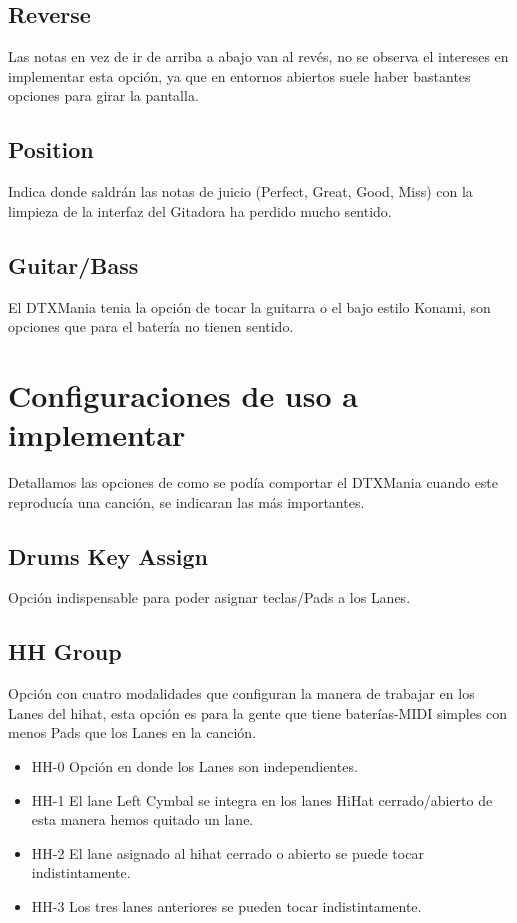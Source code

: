 \documentclass[a4paper,11pt,oneside]{book}
\begin{document}
\subsection{Reverse}
Las notas en vez de ir de arriba a abajo van al revés, no se observa el intereses en implementar esta opción, ya que en entornos abiertos suele haber bastantes opciones para girar la pantalla.

\subsection{Position}
Indica donde saldrán las notas de juicio (Perfect, Great, Good, Miss) con la limpieza de la interfaz del Gitadora ha perdido mucho sentido.

\subsection{Guitar/Bass}
El DTXMania tenia la opción de tocar la guitarra o el bajo estilo Konami, son opciones que para el batería no tienen sentido.


\section{Configuraciones de uso a implementar}
Detallamos las opciones de como se podía comportar el DTXMania cuando este reproducía una canción, se indicaran las más importantes.

\subsection{Drums Key Assign}
Opción indispensable para poder asignar teclas/\gls{Pads} a los \gls{Lanes}.

\subsection{HH Group}
Opción con cuatro modalidades que configuran la manera de trabajar en los \gls{Lanes} del hihat, esta opción es para la gente que tiene baterías-MIDI simples con menos \gls{Pads} que los \gls{Lanes} en la canción.
\begin{itemize}
  \item HH-0 Opción en donde los \gls{Lanes} son independientes.
  \item HH-1 El lane Left Cymbal se integra en los lanes HiHat cerrado/abierto de esta manera hemos quitado un lane.
  \item HH-2 El lane asignado al hihat cerrado o abierto se puede tocar indistintamente.
  \item HH-3 Los tres lanes anteriores se pueden tocar indistintamente.
\end{itemize}
\end{document}
